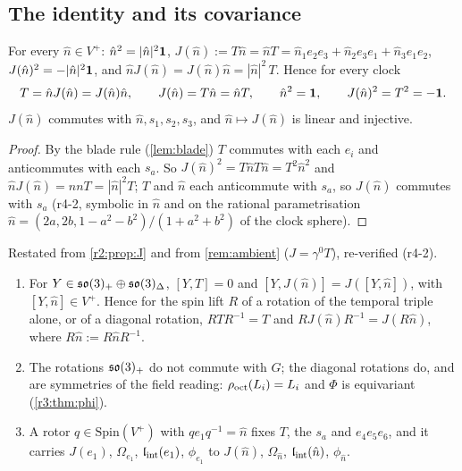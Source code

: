 \subsection{The identity and its covariance}
\label{r4:sec:identity}

\begin{proposition}
\label{r4:prop:identity}
For every $\hat n\in V^+$: $\hat n^2=|\hat n|^2\mathbf 1$, $J(\hat n):=T\hat n=\hat nT=\hat n_1e_2e_3+\hat n_2e_3e_1+\hat n_3e_1e_2$, $J(\hat n)^2=-|\hat n|^2\mathbf 1$, and $\hat nJ(\hat n)=J(\hat n)\hat n=|\hat n|^2\,T$. Hence for every clock
\[
T=\hat nJ(\hat n)=J(\hat n)\hat n,\qquad J(\hat n)=T\hat n=\hat nT,\qquad \hat n^2=\mathbf 1,\qquad J(\hat n)^2=T^2=-\mathbf 1 .
\]
$J(\hat n)$ commutes with $\hat n,s_1,s_2,s_3$, and $\hat n\mapsto J(\hat n)$ is linear and injective.
\end{proposition}

\begin{proof}
By the blade rule (\cref{lem:blade}) $T$ commutes with each $e_i$ and anticommutes with each $s_a$. So $J(\hat n)^2=T\hat nT\hat n=T^2\hat n^2$ and
$\hat nJ(\hat n)=nnT=|\hat n|^2T$; $T$ and $\hat n$ each anticommute with $s_a$, so $J(\hat n)$ commutes with $s_a$ (r4-2, symbolic in $\hat n$ and on the rational parametrisation
$\hat n=(2a,2b,1-a^2-b^2)/(1+a^2+b^2)$ of the clock sphere).
\end{proof}

Restated from \cref{r2:prop:J} and from \cref{rem:ambient} ($J=\gamma^0T$), re-verified (r4-2). 

\begin{proposition}[Rotations]
\label{r4:prop:rot}
\begin{enumerate}[label=(\roman*),leftmargin=2.2em]
\item For $Y\in\mathfrak{so}(3)_+\oplus\mathfrak{so}(3)_\Delta$, $[Y,T]=0$ and $[Y,J(\hat n)]=J([Y,\hat n])$, with $[Y,\hat n]\in V^+$. Hence for the spin lift $R$ of a rotation of the temporal
triple alone, or of a diagonal rotation, $RTR^{-1}=T$ and $RJ(\hat n)R^{-1}=J(R\hat n)$, where $R\hat n:=R\hat nR^{-1}$.
\item The rotations $\mathfrak{so}(3)_+$ do not commute with $G$; the diagonal rotations do, and are symmetries of the field reading: $\rho_{\rm oct}(L_i)=L_i$
and $\Phi$ is equivariant (\cref{r3:thm:phi}).
\item A rotor $q\in\mathrm{Spin}(V^+)$ with $qe_1q^{-1}=\hat n$ fixes $T$, the $s_a$ and $e_4e_5e_6$, and it carries $J(e_1)$, $\Omega_{e_1}$, $\mathfrak l_{\rm int}(e_1)$,
$\phi_{e_1}$ to $J(\hat n)$, $\Omega_{\hat n}$, $\mathfrak l_{\rm int}(\hat n)$, $\phi_{\hat n}$.
\end{enumerate}
\end{proposition}

